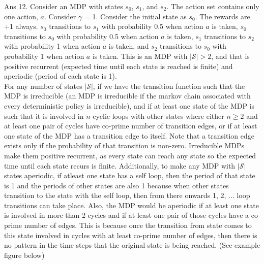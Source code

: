\documentclass[]{article}
\begin{document}
\begin{enumerate}
	{
		\color{blue}
			Ans 12. Consider an MDP with states $s_0$, $s_1$, and $s_2$. The action set contains only one action, $a$. Consider $\gamma$ = 1. Consider the initial state as $s_0$. The rewards are +1 always. $s_0$ transitions to $s_1$ with probability 0.5 when action $a$ is taken, $s_0$ transitions to $s_0$ with probability 0.5 when action $a$ is taken, $s_1$ transitions to $s_2$ with probability 1 when action $a$ is taken, and $s_2$ transitions to $s_0$ with probability 1 when action $a$ is taken. This is an MDP with $|\mathcal S| > 2$, and that is positive recurrent (expected time until each state is reached is finite) and aperiodic (period of each state is 1). \\
		For any number of states $|\mathcal S|$, if we have the transition function such that the MDP is irreducible (an MDP is irreducible if the markov chain associated with every deterministic policy is irreducible), and if at least one state of the MDP is such that it is involved in $n$ cyclic loops with other states where either $n \geq 2$ and at least one pair of cycles have co-prime number of transition edges, or if at least one state of the MDP has a transition edge to itself. Note that a transition edge exists only if the probability of that transition is non-zero. Irreducible MDPs make them positive recurrent, as every state can reach any state so the expected time until each state recurs is finite. Additionally, to make any MDP with $|\mathcal S|$ states aperiodic, if atleast one state has a self loop, then the period of that state is 1 and the periods of other states are also 1 because when other states transition to the state with the self loop, then from there onwards 1, 2, ... loop transitions can take place. Also, the MDP would be aperiodic if at least one state is involved in more than 2 cycles and if at least one pair of those cycles have a co-prime number of edges. This is because once the transition from state comes to this state involved in cycles with at least co-prime number of edges, then there is no pattern in the time steps that the original state is being reached. (See example figure below)

}
\end{enumerate}
\end{document}
